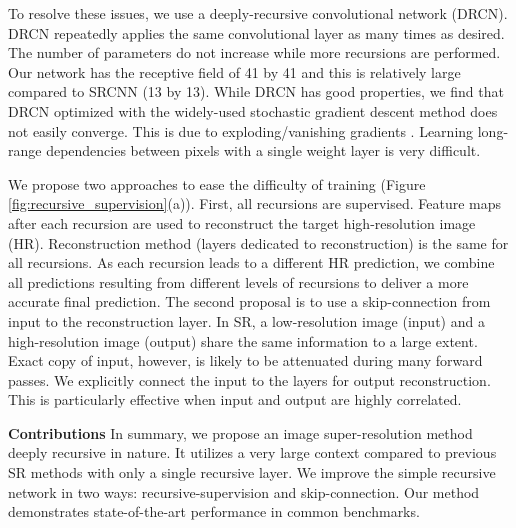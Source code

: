 \documentclass[10pt,twocolumn,letterpaper]{article}
\begin{document}


To resolve these issues, we use a deeply-recursive convolutional network (DRCN). DRCN repeatedly applies the same convolutional layer as many times as desired. The number of parameters do not increase while more recursions are performed. Our network has the receptive field of 41 by 41 and this is relatively large compared to SRCNN \cite{dong2014image} (13 by 13). While DRCN has good properties, we find that DRCN optimized with the widely-used stochastic gradient descent method does not easily converge. This is due to exploding/vanishing gradients \cite{bengio1994learning}. Learning long-range dependencies between pixels with a single weight layer is very difficult. 

We propose two approaches to ease the difficulty of training (Figure \ref{fig:recursive_supervision}(a)). First, all recursions are supervised. Feature maps after each recursion are used to reconstruct the target high-resolution image (HR). Reconstruction method (layers dedicated to reconstruction) is the same for all recursions. As each recursion leads to a different HR prediction, we combine all predictions resulting from different levels of recursions to deliver a more accurate final prediction. The second proposal is to use a skip-connection from input to the reconstruction layer. In SR, a low-resolution image (input) and a high-resolution image (output) share the same information to a large extent. Exact copy of input, however, is likely to be attenuated during many forward passes. We explicitly connect the input to the layers for output reconstruction. This is particularly effective when input and output are highly correlated.

\textbf{Contributions} In summary, we propose an image super-resolution method deeply recursive in nature. It utilizes a very large context compared to previous SR methods with only a single recursive layer. We improve the simple recursive network in two ways: recursive-supervision and skip-connection. Our method demonstrates state-of-the-art performance in common benchmarks.
\end{document}

